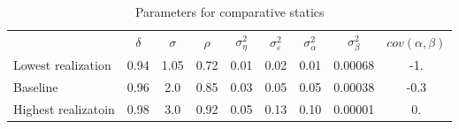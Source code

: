 \begin{table}%
\begin{tabular}{|l|cccccccc|}
                  & $\delta$ & $\sigma$ & $\rho$ & $\sigma^2_{\eta}$ & $\sigma^2_{\varepsilon}$ & $\sigma^2_{\alpha}$ & $\sigma^2_{\beta}$ & $cov(\alpha,\beta)$ \\
Lowest realization  &  0.94  &  1.05  & 0.72   &    0.01           &    0.02                  &     0.01            &      0.00068       &    -1.     \\
Baseline            &  0.96  &  2.0   & 0.85   &    0.03           &    0.05                  &     0.05            &      0.00038       &    -0.3    \\
Highest realizatoin &  0.98  &  3.0   & 0.92   &    0.05           &    0.13                  &     0.10            &      0.00001       &     0.     \\
\end{tabular}
\caption{Parameters for comparative statics}
\label{tab:comp_stat_parameters}
\end{table}

